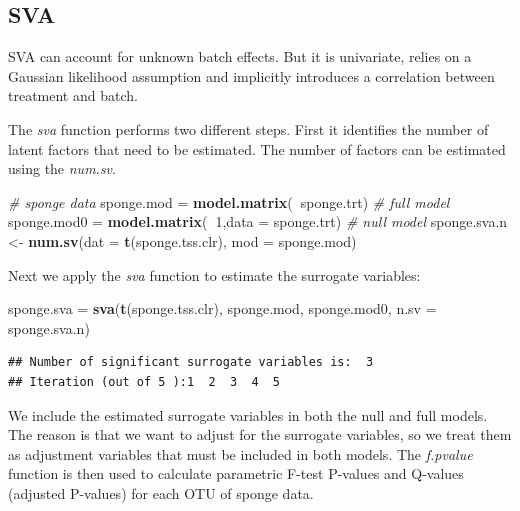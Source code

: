 \documentclass[]{book}
\newenvironment{Shaded}{\begin{snugshade}}{\end{snugshade}}
\newcommand{\KeywordTok}[1]{\textcolor[rgb]{0.13,0.29,0.53}{\textbf{#1}}}
\newcommand{\DataTypeTok}[1]{\textcolor[rgb]{0.13,0.29,0.53}{#1}}
\newcommand{\DecValTok}[1]{\textcolor[rgb]{0.00,0.00,0.81}{#1}}
\newcommand{\StringTok}[1]{\textcolor[rgb]{0.31,0.60,0.02}{#1}}
\newcommand{\CommentTok}[1]{\textcolor[rgb]{0.56,0.35,0.01}{\textit{#1}}}
\newcommand{\OperatorTok}[1]{\textcolor[rgb]{0.81,0.36,0.00}{\textbf{#1}}}
\newcommand{\NormalTok}[1]{#1}
\begin{document}
\subsection{SVA}\label{sva}

SVA can account for unknown batch effects. But it is univariate, relies
on a Gaussian likelihood assumption and implicitly introduces a
correlation between treatment and batch.

The \emph{sva} function performs two different steps. First it
identifies the number of latent factors that need to be estimated. The
number of factors can be estimated using the \emph{num.sv}.

\begin{Shaded}
\begin{Highlighting}[]
\CommentTok{# sponge data}
\NormalTok{sponge.mod =}\StringTok{ }\KeywordTok{model.matrix}\NormalTok{(}\OperatorTok{~}\NormalTok{sponge.trt) }\CommentTok{# full model}
\NormalTok{sponge.mod0 =}\StringTok{ }\KeywordTok{model.matrix}\NormalTok{(}\OperatorTok{~}\DecValTok{1}\NormalTok{,}\DataTypeTok{data =}\NormalTok{ sponge.trt) }\CommentTok{# null model}
\NormalTok{sponge.sva.n <-}\StringTok{ }\KeywordTok{num.sv}\NormalTok{(}\DataTypeTok{dat =} \KeywordTok{t}\NormalTok{(sponge.tss.clr), }\DataTypeTok{mod =}\NormalTok{ sponge.mod)}
\end{Highlighting}
\end{Shaded}

Next we apply the \emph{sva} function to estimate the surrogate
variables:

\begin{Shaded}
\begin{Highlighting}[]
\NormalTok{sponge.sva =}\StringTok{ }\KeywordTok{sva}\NormalTok{(}\KeywordTok{t}\NormalTok{(sponge.tss.clr), sponge.mod, sponge.mod0, }\DataTypeTok{n.sv =}\NormalTok{ sponge.sva.n)}
\end{Highlighting}
\end{Shaded}

\begin{verbatim}
## Number of significant surrogate variables is:  3 
## Iteration (out of 5 ):1  2  3  4  5
\end{verbatim}

We include the estimated surrogate variables in both the null and full
models. The reason is that we want to adjust for the surrogate
variables, so we treat them as adjustment variables that must be
included in both models. The \emph{f.pvalue} function is then used to
calculate parametric F-test P-values and Q-values (adjusted P-values)
for each OTU of sponge data.
\end{document}
